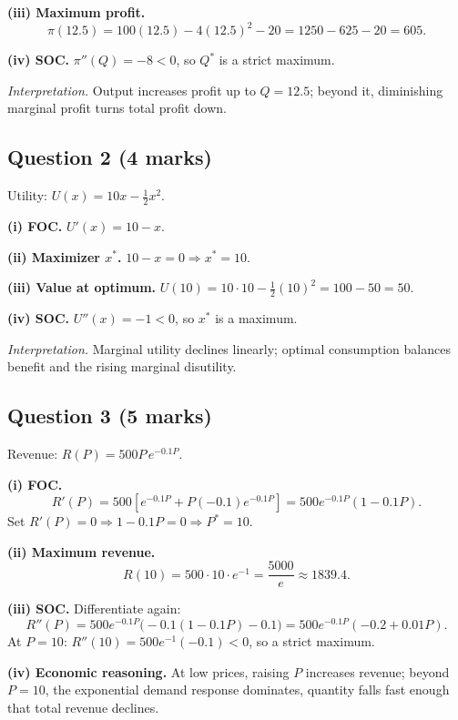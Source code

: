 \documentclass[12pt]{article}
\begin{document}
\textbf{(iii) Maximum profit.}
\[
\pi(12.5)=100(12.5)-4(12.5)^2-20=1250-625-20=605.
\]

\textbf{(iv) SOC.} $\pi''(Q)=-8<0$, so $Q^*$ is a strict maximum.

\medskip
\textit{Interpretation.} Output increases profit up to $Q=12.5$; beyond it, diminishing marginal profit turns total profit down.

\bigskip

\subsection*{Question 2 (4 marks)}
Utility: $\displaystyle U(x)=10x-\tfrac12 x^2$.

\textbf{(i) FOC.} $U'(x)=10-x$.

\textbf{(ii) Maximizer $x^*$.} $10-x=0 \Rightarrow x^*=10$.

\textbf{(iii) Value at optimum.} $U(10)=10\cdot10-\tfrac12(10)^2=100-50=50$.

\textbf{(iv) SOC.} $U''(x)=-1<0$, so $x^*$ is a maximum.

\medskip
\textit{Interpretation.} Marginal utility declines linearly; optimal consumption balances benefit and the rising marginal disutility.

\bigskip

\subsection*{Question 3 (5 marks)}
Revenue: $\displaystyle R(P)=500P\,e^{-0.1P}$.

\textbf{(i) FOC.} 
\[
R'(P)=500\left[e^{-0.1P}+P(-0.1)e^{-0.1P}\right]
=500e^{-0.1P}(1-0.1P).
\]
Set $R'(P)=0 \Rightarrow 1-0.1P=0 \Rightarrow P^*=10$.

\textbf{(ii) Maximum revenue.}
\[
R(10)=500\cdot 10 \cdot e^{-1}=\frac{5000}{e}\approx 1839.4.
\]

\textbf{(iii) SOC.} Differentiate again:
\[
R''(P)=500e^{-0.1P}\big(-0.1(1-0.1P)-0.1\big)=500e^{-0.1P}(-0.2+0.01P).
\]
At $P=10$: $R''(10)=500e^{-1}(-0.1)<0$, so a strict maximum.

\textbf{(iv) Economic reasoning.} At low prices, raising $P$ increases revenue; beyond $P=10$, the exponential demand response dominates, quantity falls fast enough that total revenue declines.
\end{document}
